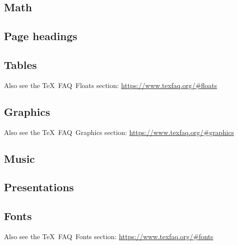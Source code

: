 \documentclass{article}
\def\TeX{TeX}%
\renewcommand*{\TeX}{TeX}
\begin{document}
\subsection{Math}
\label{sec:math}

\printbibliography[
    heading=none,
    category=math,
]


\subsection{Page headings}

\printbibliography[
    heading=none,
    category=pageheadings,
]


\subsection{Tables}

Also see the \TeX\ FAQ\ Floats section: \url{https://www.texfaq.org/#floats}

\printbibliography[
    heading=none,
    category=tables,
]


\subsection{Graphics}

Also see the \TeX\ FAQ\ Graphics section: \url{https://www.texfaq.org/#graphics}

\printbibliography[
    heading=none,
    category=graphics,
]


\subsection{Music}


\printbibliography[
    heading=none,
    category=music,
]


\subsection{Presentations}

\printbibliography[
    heading=none,
    category=presentation,
]


\subsection{Fonts}

Also see the \TeX\ FAQ\ Fonts section: \url{https://www.texfaq.org/#fonts}

\printbibliography[
    heading=none,
    category=font,
]
\end{document}
